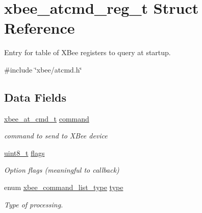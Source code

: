 \hypertarget{structxbee__atcmd__reg__t}{}\section{xbee\+\_\+atcmd\+\_\+reg\+\_\+t Struct Reference}
\label{structxbee__atcmd__reg__t}


Entry for table of X\+Bee registers to query at startup.  




{\ttfamily \#include \char`\"{}xbee/atcmd.\+h\char`\"{}}

\subsection*{Data Fields}
\begin{DoxyCompactItemize}
\item 
\mbox{\label{structxbee__atcmd__reg__t_aa1e66c60bb56acaced6ca2646fd44616}} 
\hyperlink{unionxbee__at__cmd__t}{xbee\+\_\+at\+\_\+cmd\+\_\+t} \hyperlink{structxbee__atcmd__reg__t_aa1e66c60bb56acaced6ca2646fd44616}{command}
\begin{DoxyCompactList}\small\item\em command to send to X\+Bee device \end{DoxyCompactList}\item 
\mbox{\label{structxbee__atcmd__reg__t_aa2585d779da0ab21273a8d92de9a0ebe}} 
\hyperlink{group__hal__dos_gae1affc9ca37cfb624959c866a73f83c2}{uint8\+\_\+t} \hyperlink{structxbee__atcmd__reg__t_aa2585d779da0ab21273a8d92de9a0ebe}{flags}
\begin{DoxyCompactList}\small\item\em Option flags (meaningful to callback) \end{DoxyCompactList}\item 
\mbox{\label{structxbee__atcmd__reg__t_a73e116f2bb2e10ad65a18894e74c224c}} 
enum \hyperlink{group__xbee__atcmd_ga1bd8ecd38c107579d20ded3c79a7d70b}{xbee\+\_\+command\+\_\+list\+\_\+type} \hyperlink{structxbee__atcmd__reg__t_a73e116f2bb2e10ad65a18894e74c224c}{type}
\begin{DoxyCompactList}\small\item\em Type of processing. \end{DoxyCompactList}\item 

\end{DoxyCompactItemize}
